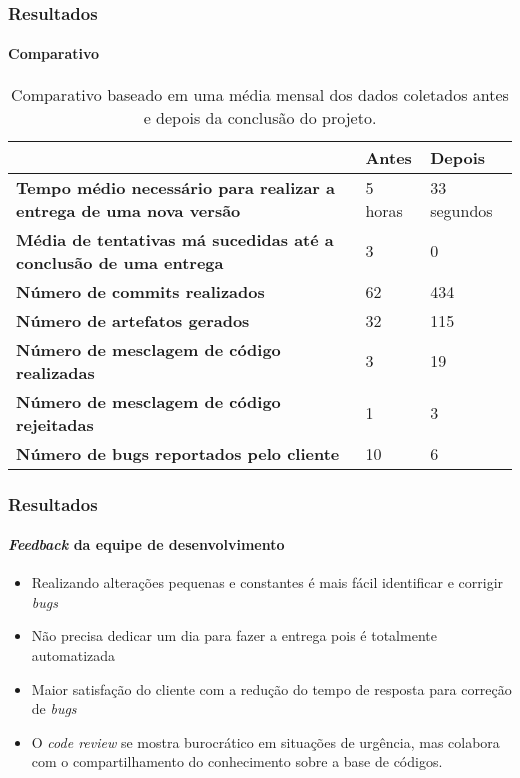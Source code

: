 \documentclass[aspectratio=169]{beamer}
\begin{document}
\begin{frame}
	\frametitle{Resultados}
	\framesubtitle{Comparativo}
	
	\begin{table}[htb]
		\caption{Comparativo baseado em uma média mensal dos dados coletados antes e depois da conclusão do projeto.}
		
		\label{tab-comparativo}	
		\begin{tabular}{p{7.85cm}|p{2.5cm}|p{2.5cm}}
			& \textbf{Antes} & \textbf{Depois}  \\
			\hline
			\textbf{Tempo médio necessário para realizar a entrega de uma nova versão} & 5 horas & 33 segundos \\
			\hline
			\textbf{Média de tentativas má sucedidas até a conclusão de uma entrega} & 3 & 0 \\
			\hline
			\textbf{Número de commits realizados} & 62 & 434 \\
			\hline
			\textbf{Número de artefatos gerados} & 32 & 115 \\
			\hline
			\textbf{Número de mesclagem de código realizadas} & 3 & 19 \\
			\hline
			\textbf{Número de mesclagem de código rejeitadas} & 1 & 3 \\
			\hline
			\textbf{Número de bugs reportados pelo cliente} & 10 & 6 \\
		\end{tabular}
	\end{table}
	
\end{frame}


\begin{frame}
	\frametitle{Resultados}
	\framesubtitle{\textit{Feedback} da equipe de desenvolvimento}
	
	\begin{itemize}
		
		\item Realizando alterações pequenas e constantes é mais fácil identificar e corrigir \textit{bugs}
		
		\item Não precisa dedicar um dia para fazer a entrega pois é totalmente automatizada
		
		\item Maior satisfação do cliente com a redução do tempo de resposta para correção de \textit{bugs} 
		
		\item O \textit{code review} se mostra burocrático em situações de urgência, mas colabora com o compartilhamento do conhecimento sobre a base de códigos.
		
	\end{itemize}
	
\end{frame}
\end{document}
